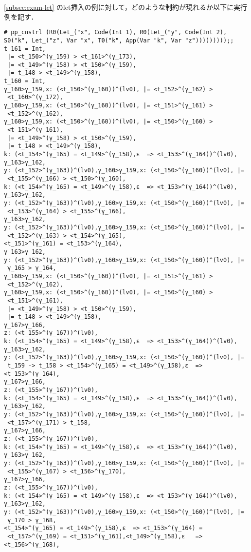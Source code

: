 \ref{subsec:exam-let} のlet挿入の例に対して，どのような制約が現れるか以下に実行例を記す．

\tiny
\begin{lstlisting}
# pp_cnstrl (R0(Let_("x", Code(Int 1), R0(Let_("y", Code(Int 2), S0("k", Let_("z", Var "x", T0("k", App(Var "k", Var "z")))))))));;
t_161 = Int,
 |= <t_150>^(γ_159) > <t_161>^(γ_173),
 |= <t_149>^(γ_158) > <t_150>^(γ_159),
 |= t_148 > <t_149>^(γ_158),
t_160 = Int,
γ_160>γ_159,x: (<t_150>^(γ_160))^(lv0), |= <t_152>^(γ_162) >
 <t_160>^(γ_172),
γ_160>γ_159,x: (<t_150>^(γ_160))^(lv0), |= <t_151>^(γ_161) >
 <t_152>^(γ_162),
γ_160>γ_159,x: (<t_150>^(γ_160))^(lv0), |= <t_150>^(γ_160) >
 <t_151>^(γ_161),
 |= <t_149>^(γ_158) > <t_150>^(γ_159),
 |= t_148 > <t_149>^(γ_158),
k: (<t_154>^(γ_165) = <t_149>^(γ_158),ε  => <t_153>^(γ_164))^(lv0),
γ_163>γ_162,
y: (<t_152>^(γ_163))^(lv0),γ_160>γ_159,x: (<t_150>^(γ_160))^(lv0), |=
 <t_155>^(γ_166) > <t_150>^(γ_160),
k: (<t_154>^(γ_165) = <t_149>^(γ_158),ε  => <t_153>^(γ_164))^(lv0),
γ_163>γ_162,
y: (<t_152>^(γ_163))^(lv0),γ_160>γ_159,x: (<t_150>^(γ_160))^(lv0), |=
 <t_153>^(γ_164) > <t_155>^(γ_166),
γ_163>γ_162,
y: (<t_152>^(γ_163))^(lv0),γ_160>γ_159,x: (<t_150>^(γ_160))^(lv0), |=
 <t_152>^(γ_163) > <t_154>^(γ_165),
<t_151>^(γ_161) = <t_153>^(γ_164),
γ_163>γ_162,
y: (<t_152>^(γ_163))^(lv0),γ_160>γ_159,x: (<t_150>^(γ_160))^(lv0), |=
 γ_165 > γ_164,
γ_160>γ_159,x: (<t_150>^(γ_160))^(lv0), |= <t_151>^(γ_161) >
 <t_152>^(γ_162),
γ_160>γ_159,x: (<t_150>^(γ_160))^(lv0), |= <t_150>^(γ_160) >
 <t_151>^(γ_161),
 |= <t_149>^(γ_158) > <t_150>^(γ_159),
 |= t_148 > <t_149>^(γ_158),
γ_167>γ_166,
z: (<t_155>^(γ_167))^(lv0),
k: (<t_154>^(γ_165) = <t_149>^(γ_158),ε  => <t_153>^(γ_164))^(lv0),
γ_163>γ_162,
y: (<t_152>^(γ_163))^(lv0),γ_160>γ_159,x: (<t_150>^(γ_160))^(lv0), |=
 t_159 -> t_158 > <t_154>^(γ_165) = <t_149>^(γ_158),ε  => <t_153>^(γ_164),
γ_167>γ_166,
z: (<t_155>^(γ_167))^(lv0),
k: (<t_154>^(γ_165) = <t_149>^(γ_158),ε  => <t_153>^(γ_164))^(lv0),
γ_163>γ_162,
y: (<t_152>^(γ_163))^(lv0),γ_160>γ_159,x: (<t_150>^(γ_160))^(lv0), |=
 <t_157>^(γ_171) > t_158,
γ_167>γ_166,
z: (<t_155>^(γ_167))^(lv0),
k: (<t_154>^(γ_165) = <t_149>^(γ_158),ε  => <t_153>^(γ_164))^(lv0),
γ_163>γ_162,
y: (<t_152>^(γ_163))^(lv0),γ_160>γ_159,x: (<t_150>^(γ_160))^(lv0), |=
 <t_155>^(γ_167) > <t_156>^(γ_170),
γ_167>γ_166,
z: (<t_155>^(γ_167))^(lv0),
k: (<t_154>^(γ_165) = <t_149>^(γ_158),ε  => <t_153>^(γ_164))^(lv0),
γ_163>γ_162,
y: (<t_152>^(γ_163))^(lv0),γ_160>γ_159,x: (<t_150>^(γ_160))^(lv0), |=
 γ_170 > γ_168,
<t_154>^(γ_165) = <t_149>^(γ_158),ε  => <t_153>^(γ_164) =
 <t_157>^(γ_169) = <t_151>^(γ_161),<t_149>^(γ_158),ε   => <t_156>^(γ_168),

\end{lstlisting}
